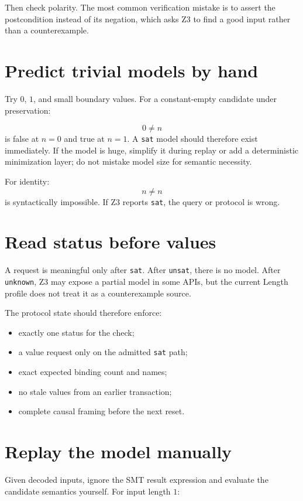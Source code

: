 \documentclass[10pt,letterpaper,oneside]{report}
\newcommand{\code}[1]{\texttt{\detokenize{#1}}}
\newcommand{\sat}{\texttt{sat}}
\newcommand{\unsat}{\texttt{unsat}}
\newcommand{\unknown}{\texttt{unknown}}
\begin{document}
Then check polarity. The most common verification mistake is to assert the postcondition instead of its negation, which asks Z3 to find a good input rather than a counterexample.

\section{Predict trivial models by hand}

Try $0$, $1$, and small boundary values. For a constant-empty candidate under preservation:

\[
  0\ne n
\]
is false at $n=0$ and true at $n=1$. A \sat{} model should therefore exist immediately. If the model is huge, simplify it during replay or add a deterministic minimization layer; do not mistake model size for semantic necessity.

For identity:
\[
  n\ne n
\]
is syntactically impossible. If Z3 reports \sat{}, the query or protocol is wrong.

\section{Read status before values}

A \code{get-value} request is meaningful only after \sat{}. After \unsat{}, there is no model. After \unknown{}, Z3 may expose a partial model in some APIs, but the current Length profile does not treat it as a counterexample source.

The protocol state should therefore enforce:

\begin{itemize}
\item exactly one status for the check;
\item a value request only on the admitted \sat{} path;
\item exact expected binding count and names;
\item no stale values from an earlier transaction;
\item complete causal framing before the next reset.
\end{itemize}

\section{Replay the model manually}

Given decoded inputs, ignore the SMT result expression and evaluate the candidate semantics yourself. For input length $1$:
\end{document}
